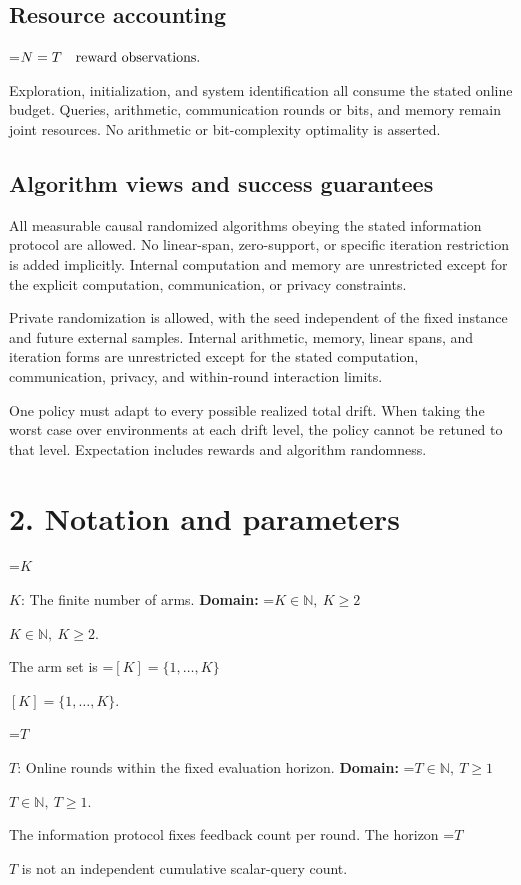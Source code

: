 \documentclass[10pt,a4paper]{article}
\newcommand{\AtlasMath}[1]{\par\begingroup\centering\setbox0=\hbox{$\displaystyle #1$}\ifdim\wd0>1.4\linewidth\typeout{ATLAS WIDE FORMULA: \the\wd0}\fi\ifdim\wd0>\linewidth\resizebox{\linewidth}{!}{\box0}\else\box0\fi\par\endgroup}
\newcommand{\AtlasInlineMath}[1]{\begingroup\setbox0=\hbox{$#1$}\ifdim\wd0>.4\linewidth\endgroup\AtlasMath{#1}\else\endgroup$#1$\fi}
\begin{document}
\subsection{Resource accounting}

\AtlasMath{N=T\quad\text{\text{reward observations}}.}


Exploration, initialization, and system identification all consume the stated online budget. Queries, arithmetic, communication rounds or bits, and memory remain joint resources. No arithmetic or bit-complexity optimality is asserted.

\subsection{Algorithm views and success guarantees}
All measurable causal randomized algorithms obeying the stated information protocol are allowed. No linear-span, zero-support, or specific iteration restriction is added implicitly. Internal computation and memory are unrestricted except for the explicit computation, communication, or privacy constraints.

Private randomization is allowed, with the seed independent of the fixed instance and future external samples. Internal arithmetic, memory, linear spans, and iteration forms are unrestricted except for the stated computation, communication, privacy, and within-round interaction limits.

One policy must adapt to every possible realized total drift. When taking the worst case over environments at each drift level, the policy cannot be retuned to that level. Expectation includes rewards and algorithm randomness.

\section{2. Notation and parameters}
\AtlasInlineMath{K}: The finite number of arms. \textbf{Domain:} \AtlasInlineMath{K\in\mathbb N,\ K\ge2}.

The arm set is \AtlasInlineMath{[K]=\{1,\ldots,K\}}.

\AtlasInlineMath{T}: Online rounds within the fixed evaluation horizon. \textbf{Domain:} \AtlasInlineMath{T\in\mathbb N,\ T\ge1}.

The information protocol fixes feedback count per round. The horizon \AtlasInlineMath{T} is not an independent cumulative scalar-query count.
\end{document}
